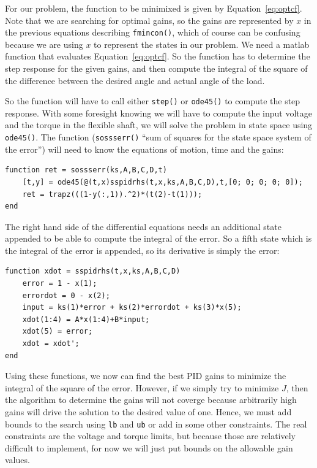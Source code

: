 For our problem, the function to be minimixed is given by Equation~\ref{eq:optcf}. Note that we are searching for optimal gains, so the gains are represented by $x$ in the previous equations describing \texttt{fmincon()}, which of course can be confusing because we are using $x$ to represent the states in our problem. We need a matlab function that evaluates Equation~\ref{eq:optcf}. So the function has to determine the step response for the given gains, and then compute the integral of the square of the difference between the desired angle and actual angle of the load.

So the function will have to call either \texttt{step()} or \texttt{ode45()} to compute the step response. With some foresight knowing we will have to compute the input voltage and the torque in the flexible shaft, we will solve the problem in state space using \texttt{ode45()}. The function (\texttt{sossserr()} ``sum of squares for the state space system of the error'') will need to know the equations of motion, time and the gains:

\begin{lstlisting}
function ret = sossserr(ks,A,B,C,D,t)
    [t,y] = ode45(@(t,x)sspidrhs(t,x,ks,A,B,C,D),t,[0; 0; 0; 0; 0]);
    ret = trapz(((1-y(:,1)).^2)*(t(2)-t(1)));
end
\end{lstlisting}

The right hand side of the differential equations needs an additional state appended to be able to compute the integral of the error. So a fifth state which is the integral of the error is appended, so its derivative is simply the error:

\begin{lstlisting}
function xdot = sspidrhs(t,x,ks,A,B,C,D)
    error = 1 - x(1);
    errordot = 0 - x(2);
    input = ks(1)*error + ks(2)*errordot + ks(3)*x(5);
    xdot(1:4) = A*x(1:4)+B*input;
    xdot(5) = error;
    xdot = xdot';
end
\end{lstlisting}

Using these functions, we now can find the best PID gains to minimize the integral of the square of the error. However, if we simply try to minimize $J$, then the algorithm to determine the gains will not coverge because arbitrarily high gains will drive the solution to the desired value of one. Hence, we must add bounds to the search using \texttt{lb} and \texttt{ub} or add in some other constraints. The real constraints are the voltage and torque limits, but because those are relatively difficult to implement, for now we will just put bounds on the allowable gain values.

